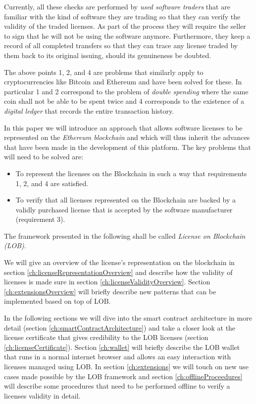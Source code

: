 \documentclass[a4paper]{article}
\begin{document}
Currently, all these checks are performed by \emph{used software traders} that are familiar with the kind of software they are trading so that they can verify the validity of the traded licenses. As part of the process they will require the seller to sign that he will not be using the software anymore. Furthermore, they keep a record of all completed transfers so that they can trace any license traded by them back to its original issuing, should its genuineness be doubted. 

The above points 1, 2, and 4 are problems that similarly apply to cryptocurrencies like Bitcoin and Ethereum and have been solved for these. In particular 1 and 2 correspond to the problem of \emph{double spending} where the same coin shall not be able to be spent twice and 4 corresponds to the existence of a \emph{digital ledger} that records the entire transaction history.

In this paper we will introduce an approach that allows software licenses to be represented on the \emph{Ethereum blockchain} and which will thus inherit the advances that have been made in the development of this platform. The key problems that will need to be solved are:
\begin{itemize}
  \item To represent the licenses on the Blockchain in such a way that requirements 1, 2, and 4 are satisfied.
  \item To verify that all licenses represented on the Blockchain are backed by a validly purchased license that is accepted by the software manufacturer (requirement 3).
\end{itemize}

The framework presented in the following shall be called \emph{License on Blockchain (LOB)}.

We will give an overview of the license's representation on the blockchain in section \ref{ch:licenseRepresentationOverview} and describe how the validity of licenses is made sure in section \ref{ch:licenseValidityOverview}. Section \ref{ch:extensionsOverview} will briefly describe new patterns that can be implemented based on top of LOB.

In the following sections we will dive into the smart contract architecture in more detail (section \ref{ch:smartContractArchitecture}) and take a closer look at the license certificate that gives credibility to the LOB licenses (section \ref{ch:licenseCertificate}). Section \ref{ch:wallet} will briefly describe the LOB wallet that runs in a normal internet browser and allows an easy interaction with licenses managed using LOB. In section \ref{ch:extensions} we will touch on new use cases made possible by the LOB framework and section \ref{ch:offlineProceedures} will describe some procedures that need to be performed offline to verify a licenses validity in detail.
\end{document}
